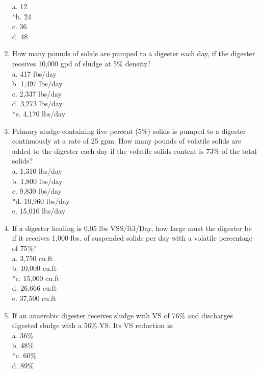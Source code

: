 \documentclass{article}
\begin{document}
\begin{enumerate}
a. 12 \\
*b. 24 \\
c. 36 \\
d. 48 \\

\item  How many pounds of solids are pumped to a digester each day, if the digester receives 10,000 gpd of sludge at 5\% density? \\

a. 417 lbs/day \\
b. 1,497 lbs/day \\
c. 2,337 lbs/day \\
d. 3,273 lbs/day \\
*e. 4,170 lbs/day \\

\item  Primary sludge containing five percent (5\%) solids is pumped to a digester continuously at a rate of 25 gpm. How many pounds of volatile solids are added to the digester each day if the volatile solids content is 73\% of the total solids? \\

a. 1,310 lbs/day \\
b. 1,800 lbs/day \\
c. 9,830 lbs/day \\
*d. 10,960 lbs/day \\
e. 15,010 lbs/day \\

\item  If a digester loading is 0.05 lbs VSS/ft3/Day, how large must the digester be if it receives 1,000 lbs. of suspended solids per day with a volatile percentage of 75\%? \\

a. 3,750 cu.ft \\
b. 10,000 cu.ft \\
*c. 15,000 cu.ft \\
d. 26,666 cu.ft \\
e. 37,500 cu.ft \\

\item  If an anaerobic digester receives sludge with VS of 76\% and discharges digested sludge with a 56\% VS.  Its VS reduction is: \\

a. 36\% \\
b. 48\% \\
*c. 60\% \\
d. 89\% \\


\end{enumerate}
\end{document}
